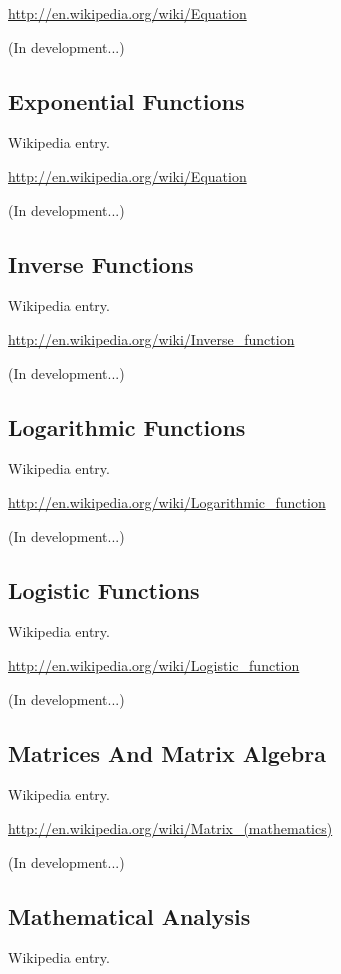 \documentclass[12pt,twoside]{book}
\begin{document}
\href{http://en.wikipedia.org/wiki/Equation}{http://en.wikipedia.org/wiki/Equation}

(In development...)

\subsection[Exponential Functions]{Exponential
Functions}
Wikipedia entry.

\href{http://en.wikipedia.org/wiki/Equation}{http://en.wikipedia.org/wiki/Equation}

(In development...)

\subsection[Inverse Functions]{Inverse Functions}
Wikipedia entry.

\href{http://en.wikipedia.org/wiki/Inverse_function}{http://en.wikipedia.org/wiki/Inverse\_function}

(In development...)

\subsection[Logarithmic Functions]{Logarithmic
Functions}
Wikipedia entry.

\href{http://en.wikipedia.org/wiki/Logarithmic_function}{http://en.wikipedia.org/wiki/Logarithmic\_function}

(In development...)

\subsection[Logistic Functions]{Logistic Functions}
Wikipedia entry.

\href{http://en.wikipedia.org/wiki/Logistic_function}{http://en.wikipedia.org/wiki/Logistic\_function}

(In development...)

\subsection[Matrices And Matrix Algebra]{Matrices
And Matrix Algebra}
Wikipedia entry.

\href{http://en.wikipedia.org/wiki/Matrix_(mathematics)}{http://en.wikipedia.org/wiki/Matrix\_(mathematics)}

(In development...)

\subsection[Mathematical Analysis]{Mathematical
Analysis}
Wikipedia entry.
\end{document}
